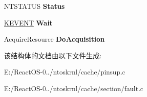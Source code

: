 \begin{DoxyCompactItemize}
N\+T\+S\+T\+A\+T\+US {\bfseries Status}
\item 
\mbox{\label{struct___w_o_r_k___q_u_e_u_e___w_i_t_h___c_o_n_t_e_x_t_adb2fed1bae6da0441e32c9a83fa43f99}} 
\hyperlink{struct___k_e_v_e_n_t}{K\+E\+V\+E\+NT} {\bfseries Wait}
\item 
\mbox{\label{struct___w_o_r_k___q_u_e_u_e___w_i_t_h___c_o_n_t_e_x_t_a30518215a0b9573a9de9476e5e951ca1}} 
Acquire\+Resource {\bfseries Do\+Acquisition}
\end{DoxyCompactItemize}


该结构体的文档由以下文件生成\+:\begin{DoxyCompactItemize}
\item 
E\+:/\+React\+O\+S-\/0../ntoskrnl/cache/pinsup.\+c\item 
E\+:/\+React\+O\+S-\/0../ntoskrnl/cache/section/fault.\+c\end{DoxyCompactItemize}
